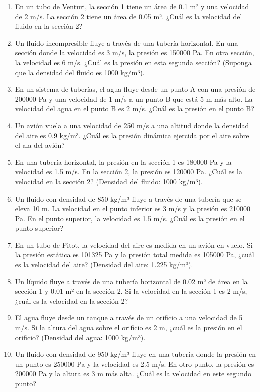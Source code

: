 \documentclass[../main]{subfiles}
\begin{document}
\begin{enumerate}
\item En un tubo de Venturi, la sección 1 tiene un área de 0.1 m² y una velocidad de 2 m/s. La sección 2 tiene un área de 0.05 m². ¿Cuál es la velocidad del fluido en la sección 2?
\item Un fluido incompresible fluye a través de una tubería horizontal. En una sección donde la velocidad es 3 m/s, la presión es 150000 Pa. En otra sección, la velocidad es 6 m/s. ¿Cuál es la presión en esta segunda sección? (Suponga que la densidad del fluido es 1000 kg/m³).
\item En un sistema de tuberías, el agua fluye desde un punto A con una presión de 200000 Pa y una velocidad de 1 m/s a un punto B que está 5 m más alto. La velocidad del agua en el punto B es 2 m/s. ¿Cuál es la presión en el punto B?
\item Un avión vuela a una velocidad de 250 m/s a una altitud donde la densidad del aire es 0.9 kg/m³. ¿Cuál es la presión dinámica ejercida por el aire sobre el ala del avión?
\item En una tubería horizontal, la presión en la sección 1 es 180000 Pa y la velocidad es 1.5 m/s. En la sección 2, la presión es 120000 Pa. ¿Cuál es la velocidad en la sección 2? (Densidad del fluido: 1000 kg/m³).
\item Un fluido con densidad de 850 kg/m³ fluye a través de una tubería que se eleva 10 m. La velocidad en el punto inferior es 3 m/s y la presión es 210000 Pa. En el punto superior, la velocidad es 1.5 m/s. ¿Cuál es la presión en el punto superior?
\item En un tubo de Pitot, la velocidad del aire es medida en un avión en vuelo. Si la presión estática es 101325 Pa y la presión total medida es 105000 Pa, ¿cuál es la velocidad del aire? (Densidad del aire: 1.225 kg/m³).
\item Un líquido fluye a través de una tubería horizontal de 0.02 m² de área en la sección 1 y 0.01 m² en la sección 2. Si la velocidad en la sección 1 es 2 m/s, ¿cuál es la velocidad en la sección 2?
\item El agua fluye desde un tanque a través de un orificio a una velocidad de 5 m/s. Si la altura del agua sobre el orificio es 2 m, ¿cuál es la presión en el orificio? (Densidad del agua: 1000 kg/m³).
\item Un fluido con densidad de 950 kg/m³ fluye en una tubería donde la presión en un punto es 250000 Pa y la velocidad es 2.5 m/s. En otro punto, la presión es 200000 Pa y la altura es 3 m más alta. ¿Cuál es la velocidad en este segundo punto?
\end{enumerate}
\end{document}
